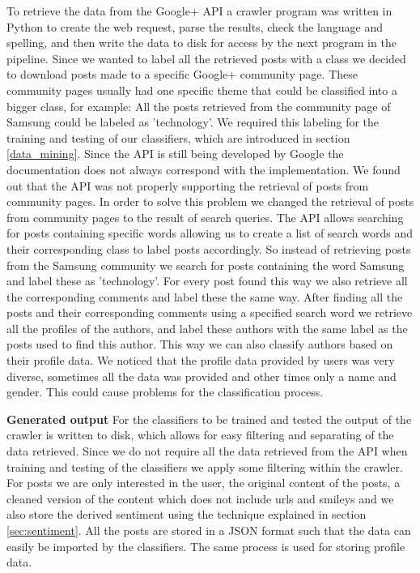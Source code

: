 To retrieve the data from the Google+ API a crawler program was written in Python to create the web request, parse the results, check the language and spelling, and then write the data to disk for access by the next program in the pipeline. Since we wanted to label all the retrieved posts with a class we decided to download posts made to a specific Google+ community page. These community pages usually had one specific theme that could be classified into a bigger class, for example: All the posts retrieved from the community page of Samsung could be labeled as 'technology'. We required this labeling for the training and testing of our classifiers, which are introduced in section \ref{data_mining}.
Since the API is still being developed by Google the documentation does not always correspond with the implementation. We found out that the API was not properly supporting the retrieval of posts from community pages. In order to solve this problem we changed the retrieval of posts from community pages to the result of search queries. The API allows searching for posts containing specific words allowing us to create a list of search words and their corresponding class to label posts accordingly. So instead of retrieving posts from the Samsung community we search for posts containing the word Samsung and label these as 'technology'.
For every post found this way we also retrieve all the corresponding comments and label these the same way. After finding all the posts and their corresponding comments using a specified search word we retrieve all the profiles of the authors, and label these authors with the same label as the posts used to find this author. This way we can also classify authors based on their profile data. We noticed that the profile data provided by users was very diverse, sometimes all the data was provided and other times only a name and gender. This could cause problems for the classification process.

\textbf{Generated output}
For the classifiers to be trained and tested the output of the crawler is written to disk, which allows for easy filtering and separating of the data retrieved. Since we do not require all the data retrieved from the API when training and testing of the classifiers we apply some filtering within the crawler. For posts we are only interested in the user, the original content of the posts, a cleaned version of the content which does not include urls and smileys and we also store the derived sentiment using the technique explained in section \ref{sec:sentiment}. All the posts are stored in a JSON format such that the data can easily be imported by the classifiers. The same process is used for storing profile data.
